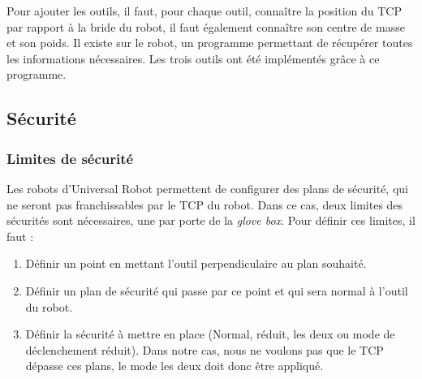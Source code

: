 Pour ajouter les outils, il faut, pour chaque outil, connaître la position du TCP par rapport à la bride du robot, il faut également connaître son centre de masse et son poids.
Il existe sur le robot, un programme permettant de récupérer toutes les informations nécessaires. Les trois outils ont été implémentés grâce à ce programme.


\subsection{Sécurité}
\subsubsection*{Limites de sécurité}
Les robots d'Universal Robot permettent de configurer des plans de sécurité, qui ne seront pas franchissables par le TCP du robot. Dans ce cas, deux limites des sécurités sont nécessaires, une par porte de la \textit{glove box}.
Pour définir ces limites, il faut :
\begin{enumerate}
    \item Définir un point en mettant l'outil perpendiculaire au plan souhaité.
    \item Définir un plan de sécurité qui passe par ce point et qui sera normal à l'outil du robot.
    \item Définir la sécurité à mettre en place (Normal, réduit, les deux ou mode de déclenchement réduit). Dans notre cas, nous ne voulons pas que le TCP dépasse ces plans, le mode \og{}les deux\fg{} doit donc être appliqué.
\end{enumerate}

